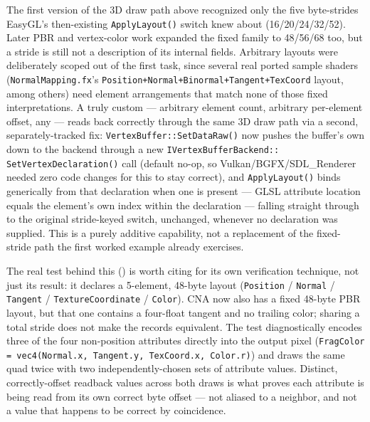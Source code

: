 The first version of the 3D draw path above recognized only the five byte-strides EasyGL's
then-existing \texttt{ApplyLayout()} switch knew about (16/20/24/32/52). Later PBR and
vertex-color work expanded the fixed family to 48/56/68 too, but a stride is still not a
description of its internal fields. Arbitrary layouts were deliberately scoped out of the
first task, since several real ported sample shaders
(\texttt{NormalMapping.fx}'s \texttt{Position+Normal+Binormal+Tangent+TexCoord} layout,
among others) need element arrangements that match none of those fixed interpretations. A
truly custom  --- arbitrary element count, arbitrary per-element
offset, any  --- reads back correctly through the same 3D
 draw path via a second, separately-tracked fix:
\texttt{VertexBuffer::SetDataRaw()}
now pushes the buffer's own  down to the backend through a new
\texttt{IVertexBuffer}\allowbreak{}\texttt{Backend::}\allowbreak{}%
\texttt{SetVertexDeclaration()} call (default no-op, so
Vulkan/BGFX/SDL\_Renderer needed zero code changes for this to stay correct), and
\texttt{ApplyLayout()} binds
generically from that declaration when one is present --- GLSL attribute location equals
the element's own index within the declaration --- falling straight through to the
original stride-keyed switch, unchanged, whenever no declaration was supplied. This is a
purely additive capability, not a replacement of the fixed-stride path the first worked
example already exercises.

The real test behind this ()
is worth citing for its own verification technique, not just its result: it declares a
5-element, 48-byte layout (\texttt{Position} / \texttt{Normal} / \texttt{Tangent} / %
\texttt{TextureCoordinate} / \texttt{Color}). CNA now also has a fixed 48-byte PBR layout,
but that one contains a four-float tangent and no trailing color; sharing a total stride does
not make the records equivalent. The test diagnostically encodes three of the four
non-position attributes directly into the output pixel
(\texttt{FragColor = vec4(Normal.x, Tangent.y, TexCoord.x, Color.r)}) and draws the same
quad twice with two independently-chosen sets of attribute values. Distinct, correctly-offset
readback values across both draws is what proves each attribute is being read from its own
correct byte offset --- not aliased to a neighbor, and not a value that happens to be
correct by coincidence.

